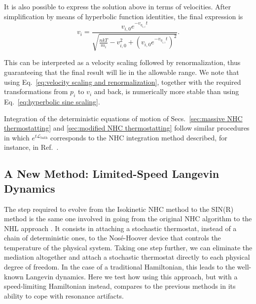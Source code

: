 \documentclass[
aip,
jcp,
reprint,
]{revtex4-1}
\newcommand{\vt}[1]{\boldsymbol{\mathbf{#1}}}          %
\newcommand{\Liu}{\mathcal{L}}
\newcommand{\nn}{n}
\begin{document}
It is also possible to express the solution above in terms of velocities.
After simplification by means of hyperbolic function identities, the final expression is
\begin{equation}
\label{eq:velocity scaling and renormalization}
v_i = \frac{v_{i,0} e^{-v_{\eta_{1,i}} t}}{\sqrt{\frac{\nn kT}{m_i} - v_{i,0}^2 + \left(v_{i,0} e^{- v_{\eta_{1,i}} t}\right)^2}}.
\end{equation}

This can be interpreted as a velocity scaling followed by renormalization, thus guaranteeing that the final result will lie in the allowable range.
We note that using Eq.~\eqref{eq:velocity scaling and renormalization}, together with the required transformations from $p_i$ to $v_i$ and back, is numerically more stable than using Eq.~\eqref{eq:hyperbolic sine scaling}.

Integration of the deterministic equations of motion of Secs.~\ref{sec:massive NHC thermostatting} and \ref{sec:modified NHC thermostatting} follow similar procedures in which $e^{t \Liu_\mathrm{bath}}$ corresponds to the NHC integration method described, for instance, in Ref.~.

\subsection{A New Method: Limited-Speed Langevin Dynamics}

The step required to evolve from the Isokinetic NHC method \cite{Minary_2004} to the SIN(R) method \cite{Leimkuhler_2013} is the same one involved in going from the original NHC algorithm \cite{Martyna_1992, Martyna_1996} to the NHL approach \cite{Samoletov_2007, Leimkuhler_2009}.
It consists in attaching a stochastic thermostat, instead of a chain of deterministic ones, to the Nos\'{e}-Hoover device that controls the temperature of the physical system.
Taking one step further, we can eliminate the mediation altogether and attach a stochastic thermostat directly to each physical degree of freedom.
In the case of a traditional Hamiltonian, this leads to the well-known Langevin dynamics.
Here we test how using this approach, but with a speed-limiting Hamiltonian instead, compares to the previous methods in its ability to cope with resonance artifacts.
\end{document}
